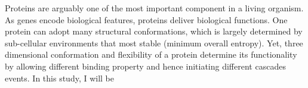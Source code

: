 Proteins are arguably one of the most important component in a living organism. As genes encode biological features, proteins deliver biological functions. One protein can adopt many structural conformations, which is largely determined by sub-cellular environments that most stable (minimum overall entropy). Yet, three dimensional conformation and flexibility of a protein determine its functionality by allowing different binding property and hence initiating different cascades events. In this study, I will be 